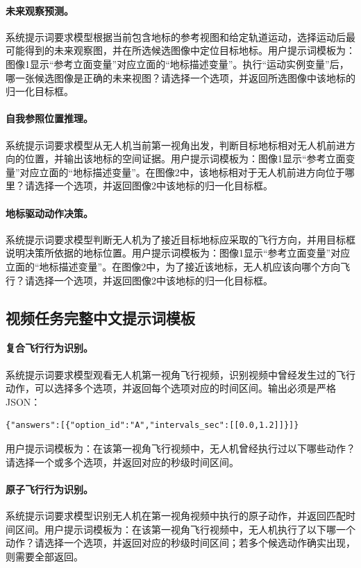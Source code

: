 \begin{thesisappendix}
\paragraph{未来观察预测。}
系统提示词要求模型根据当前包含地标的参考视图和给定轨道运动，选择运动后最可能得到的未来观察图，并在所选候选图像中定位目标地标。用户提示词模板为：图像1显示“参考立面变量”对应立面的“地标描述变量”。执行“运动实例变量”后，哪一张候选图像是正确的未来视图？请选择一个选项，并返回所选图像中该地标的归一化目标框。

\paragraph{自我参照位置推理。}
系统提示词要求模型从无人机当前第一视角出发，判断目标地标相对无人机前进方向的位置，并输出该地标的空间证据。用户提示词模板为：图像1显示“参考立面变量”对应立面的“地标描述变量”。在图像2中，该地标相对于无人机前进方向位于哪里？请选择一个选项，并返回图像2中该地标的归一化目标框。

\paragraph{地标驱动动作决策。}
系统提示词要求模型判断无人机为了接近目标地标应采取的飞行方向，并用目标框说明决策所依据的地标位置。用户提示词模板为：图像1显示“参考立面变量”对应立面的“地标描述变量”。在图像2中，为了接近该地标，无人机应该向哪个方向飞行？请选择一个选项，并返回图像2中该地标的归一化目标框。

\subsection{视频任务完整中文提示词模板}

\paragraph{复合飞行行为识别。}
系统提示词要求模型观看无人机第一视角飞行视频，识别视频中曾经发生过的飞行动作，可以选择多个选项，并返回每个选项对应的时间区间。输出必须是严格 JSON：
\begin{verbatim}
{"answers":[{"option_id":"A","intervals_sec":[[0.0,1.2]]}]}
\end{verbatim}
用户提示词模板为：在该第一视角飞行视频中，无人机曾经执行过以下哪些动作？请选择一个或多个选项，并返回对应的秒级时间区间。

\paragraph{原子飞行行为识别。}
系统提示词要求模型识别无人机在第一视角视频中执行的原子动作，并返回匹配时间区间。用户提示词模板为：在该第一视角飞行视频中，无人机执行了以下哪一个动作？请选择一个选项，并返回对应的秒级时间区间；若多个候选动作确实出现，则需要全部返回。


\end{thesisappendix}

